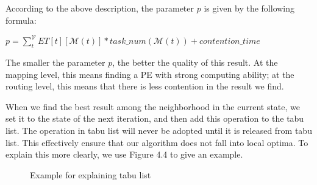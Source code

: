 According to the above description, the parameter $p$ is given by the following formula:
\begin{center}
    $p=\sum_{t}^{\mathcal{V}}ET[t][\mathcal{M}(t)]*task\_num(\mathcal{M}(t))+contention\_time$
\end{center}


The smaller the parameter $p$, the better the quality of this result. At the mapping level, this means finding a PE with strong computing ability; at the routing level, this means that there is less contention in the result we find.

When we find the best result among the neighborhood in the current state, we set it to the state of the next iteration, and then add this operation to the tabu list. The operation in tabu list will never be adopted until it is released from tabu list. This effectively ensure that our algorithm does not fall into local optima. To explain this more clearly, we use Figure 4.4 to give an example.

\begin{figure}
    \centering
    \caption{Example for explaining tabu list}
\end{figure}

